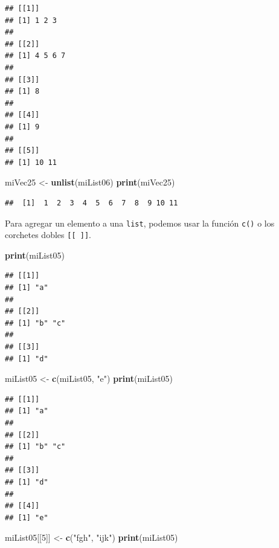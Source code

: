 \documentclass[]{book}
\newenvironment{Shaded}{\begin{snugshade}}{\end{snugshade}}
\newcommand{\KeywordTok}[1]{\textcolor[rgb]{0.13,0.29,0.53}{\textbf{#1}}}
\newcommand{\DecValTok}[1]{\textcolor[rgb]{0.00,0.00,0.81}{#1}}
\newcommand{\StringTok}[1]{\textcolor[rgb]{0.31,0.60,0.02}{#1}}
\newcommand{\NormalTok}[1]{#1}
\begin{document}
\begin{verbatim}
## [[1]]
## [1] 1 2 3
## 
## [[2]]
## [1] 4 5 6 7
## 
## [[3]]
## [1] 8
## 
## [[4]]
## [1] 9
## 
## [[5]]
## [1] 10 11
\end{verbatim}

\begin{Shaded}
\begin{Highlighting}[]
\NormalTok{miVec25 <-}\StringTok{ }\KeywordTok{unlist}\NormalTok{(miList06)}
\KeywordTok{print}\NormalTok{(miVec25)}
\end{Highlighting}
\end{Shaded}

\begin{verbatim}
##  [1]  1  2  3  4  5  6  7  8  9 10 11
\end{verbatim}

Para agregar un elemento a una \texttt{list}, podemos usar la función
\texttt{c()} o los corchetes dobles \texttt{{[}{[}\ {]}{]}}.

\begin{Shaded}
\begin{Highlighting}[]
\KeywordTok{print}\NormalTok{(miList05)}
\end{Highlighting}
\end{Shaded}

\begin{verbatim}
## [[1]]
## [1] "a"
## 
## [[2]]
## [1] "b" "c"
## 
## [[3]]
## [1] "d"
\end{verbatim}

\begin{Shaded}
\begin{Highlighting}[]
\NormalTok{miList05 <-}\StringTok{ }\KeywordTok{c}\NormalTok{(miList05, }\StringTok{"e"}\NormalTok{)}
\KeywordTok{print}\NormalTok{(miList05)}
\end{Highlighting}
\end{Shaded}

\begin{verbatim}
## [[1]]
## [1] "a"
## 
## [[2]]
## [1] "b" "c"
## 
## [[3]]
## [1] "d"
## 
## [[4]]
## [1] "e"
\end{verbatim}

\begin{Shaded}
\begin{Highlighting}[]
\NormalTok{miList05[[}\DecValTok{5}\NormalTok{]] <-}\StringTok{ }\KeywordTok{c}\NormalTok{(}\StringTok{"fgh"}\NormalTok{, }\StringTok{"ijk"}\NormalTok{)}
\KeywordTok{print}\NormalTok{(miList05)}
\end{Highlighting}
\end{Shaded}
\end{document}
